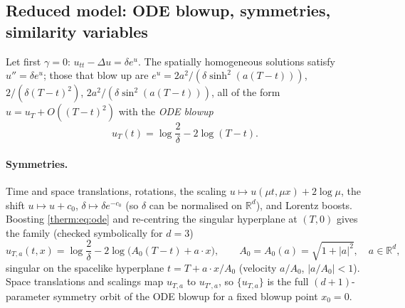 \subsection{Reduced model: ODE blowup, symmetries, similarity variables}
\label{therm:sec:reduced}

Let first $\gamma=0$: $u_{tt}-\Delta u=\delta e^u$.  The spatially homogeneous
solutions satisfy $u''=\delta e^u$; those that blow up are
$e^{u}=2a^2/(\delta\sinh^2(a(T-t)))$, $2/(\delta(T-t)^2)$, $2a^2/(\delta\sin^2(a(T-t)))$,
all of the form $u=u_T+O((T-t)^2)$ with the \emph{ODE blowup}
\begin{equation}\label{therm:eq:ode}
  u_T(t)=\log\frac{2}{\delta}-2\log(T-t).
\end{equation}
\paragraph{Symmetries.}  Time and space translations, rotations, the scaling
$u\mapsto u(\mu t,\mu x)+2\log\mu$, the shift $u\mapsto u+c_0$, $\delta\mapsto
\delta e^{-c_0}$ (so $\delta$ can be normalised on $\mathbb{R}^d$), and Lorentz boosts.
Boosting \cref{therm:eq:ode} and re-centring the singular hyperplane at $(T,0)$ gives
the family (checked symbolically for $d=3$)
\begin{equation}\label{therm:eq:boosted}
  u_{T,a}(t,x)=\log\frac{2}{\delta}-2\log\bigl(A_0(T-t)+a\cdot x\bigr),\qquad
  A_0=A_0(a)=\sqrt{1+|a|^2},\quad a\in\mathbb{R}^d ,
\end{equation}
singular on the spacelike hyperplane $t=T+a\cdot x/A_0$ (velocity $a/A_0$,
$|a/A_0|<1$).  Space translations and scalings map $u_{T,a}$ to $u_{T',a}$, so
$\{u_{T,a}\}$ is the full $(d+1)$-parameter symmetry orbit of the ODE blowup for a
fixed blowup point $x_0=0$.

